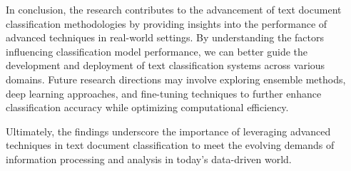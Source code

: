 In conclusion, the research contributes to the advancement of text document classification methodologies by providing insights into the performance of advanced techniques in real-world settings. By understanding the factors influencing classification model performance, we can better guide the development and deployment of text classification systems across various domains. Future research directions may involve exploring ensemble methods, deep learning approaches, and fine-tuning techniques to further enhance classification accuracy while optimizing computational efficiency.

Ultimately, the findings underscore the importance of leveraging advanced techniques in text document classification to meet the evolving demands of information processing and analysis in today's data-driven world.
